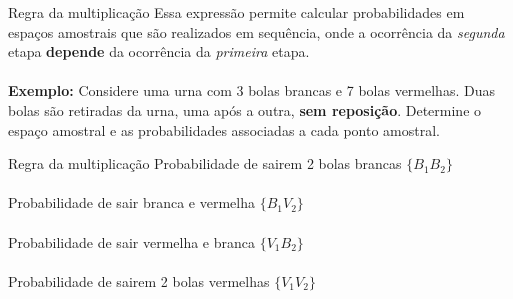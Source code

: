 \documentclass[10pt]{beamer}\usepackage[]{graphicx}\usepackage[]{color}
\theoremstyle{definition}
\begin{document}
\begin{frame}[fragile]{Regra da multiplicação} %
  Essa expressão permite calcular probabilidades em espaços amostrais
  que são realizados em sequência, onde a ocorrência da \textsl{segunda}
  etapa \textbf{depende} da ocorrência da \textsl{primeira} etapa. \\~\\
  \textbf{Exemplo:} Considere uma urna com 3 bolas brancas e 7 bolas
  vermelhas. Duas bolas são retiradas da urna, uma após a outra,
  \textbf{sem reposição}. Determine o espaço amostral e as
  probabilidades associadas a cada ponto amostral.
\end{frame}

\begin{frame}[fragile]{Regra da multiplicação} %
  Probabilidade de sairem 2 bolas brancas $\{B_1B_2\}$ \\~\\
  \vspace{1em}
  Probabilidade de sair branca e vermelha $\{B_1V_2\}$ \\~\\
    \vspace{1em}
  Probabilidade de sair vermelha e branca $\{V_1B_2\}$ \\~\\
    \vspace{1em}
    Probabilidade de sairem 2 bolas vermelhas $\{V_1V_2\}$ \\~\\
\end{frame}
\end{document}
